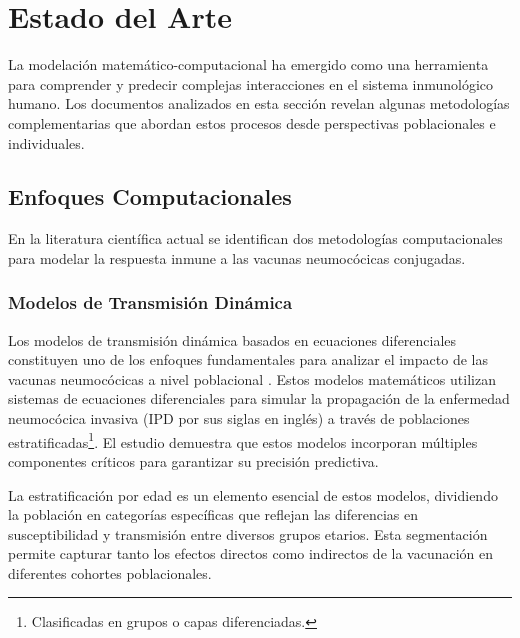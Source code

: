 \chapter{Estado del Arte}\label{chapter:estadoarte}

La modelación matemático-computacional ha emergido como una herramienta para comprender y predecir complejas interacciones en el sistema inmunológico humano. Los documentos analizados en esta sección revelan algunas metodologías complementarias que abordan estos procesos desde perspectivas poblacionales e individuales.

\section{Enfoques Computacionales}

En la literatura científica actual se identifican dos metodologías computacionales para modelar la respuesta inmune a las vacunas neumocócicas conjugadas.

\subsection{Modelos de Transmisión Dinámica}

Los modelos de transmisión dinámica basados en ecuaciones diferenciales constituyen uno de los enfoques fundamentales para analizar el impacto de las vacunas neumocócicas a nivel poblacional \cite{Choi2021}. Estos modelos matemáticos utilizan sistemas de ecuaciones diferenciales para simular la propagación de la enfermedad neumocócica invasiva (IPD por sus siglas en inglés) a través de poblaciones estratificadas\footnote{Clasificadas en grupos o capas diferenciadas.}. El estudio \cite{Snedecor2020a} demuestra que estos modelos incorporan múltiples componentes críticos para garantizar su precisión predictiva.

La estratificación por edad es un elemento esencial de estos modelos, dividiendo la población en categorías específicas que reflejan las diferencias en susceptibilidad y transmisión entre diversos grupos etarios. Esta segmentación permite capturar tanto los efectos directos como indirectos de la vacunación en diferentes cohortes poblacionales.

